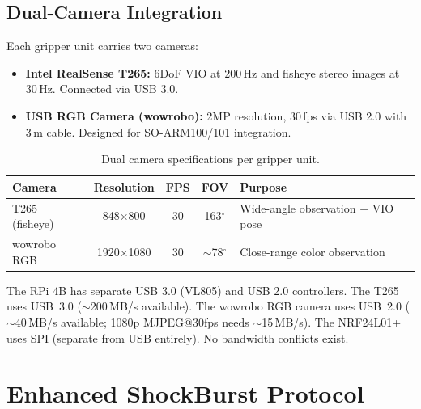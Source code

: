 \documentclass[11pt,a4paper]{article}
\begin{document}
\subsection{Dual-Camera Integration}

Each gripper unit carries two cameras:

\begin{itemize}
  \item \textbf{Intel RealSense T265:} 6DoF VIO at 200\,Hz and fisheye stereo images at 30\,Hz. Connected via USB 3.0.
  \item \textbf{USB RGB Camera (wowrobo):} 2MP resolution, 30\,fps via USB 2.0 with 3\,m cable. Designed for SO-ARM100/101 integration.
\end{itemize}

\begin{table}[htbp]
\centering
\caption{Dual camera specifications per gripper unit.}
\begin{tabular}{l c c c l}
\toprule
\textbf{Camera} & \textbf{Resolution} & \textbf{FPS} & \textbf{FOV} & \textbf{Purpose} \\
\midrule
T265 (fisheye) & 848$\times$800 & 30 & 163$^\circ$ & Wide-angle observation + VIO pose \\
wowrobo RGB & 1920$\times$1080 & 30 & ${\sim}$78$^\circ$ & Close-range color observation \\
\bottomrule
\end{tabular}
\label{tab:cameras}
\end{table}

\begin{infobox}
The RPi 4B has separate USB 3.0 (VL805) and USB 2.0 controllers. The T265 uses USB~3.0 (${\sim}$200\,MB/s available). The wowrobo RGB camera uses USB~2.0 (${\sim}$40\,MB/s available; 1080p MJPEG@30fps needs ${\sim}$15\,MB/s). The NRF24L01+ uses SPI (separate from USB entirely). No bandwidth conflicts exist.
\end{infobox}


\section{Enhanced ShockBurst Protocol}
\end{document}
